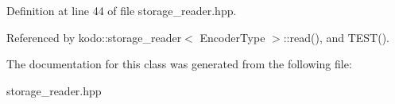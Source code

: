 Definition at line 44 of file storage\-\_\-reader.\-hpp.



Referenced by kodo\-::storage\-\_\-reader$<$ Encoder\-Type $>$\-::read(), and T\-E\-S\-T().



The documentation for this class was generated from the following file\-:\begin{DoxyCompactItemize}
\item 
storage\-\_\-reader.\-hpp\end{DoxyCompactItemize}
